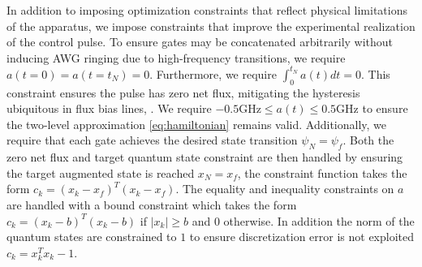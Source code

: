 In addition to imposing optimization constraints that
reflect physical limitations of the apparatus, we impose
constraints that improve the experimental realization of the control pulse.
To ensure gates may be concatenated arbitrarily without
inducing AWG ringing due to high-frequency transitions,
we require $a(t = 0) = a(t = t_{N}) = 0$.
Furthermore, we require $\int_{0}^{t_{N}} a(t) dt = 0$. This
constraint ensures the pulse has zero net flux, mitigating
the hysteresis ubiquitous in flux bias lines,
\cite{battistel2019fast, krantz2019quantum, zhang2020universal}.
We require $-0.5 \textrm{GHz} \le a(t) \le 0.5 \textrm{GHz}$
to ensure the two-level approximation \eqref{eq:hamiltonian}
remains valid. Additionally, we require that each gate achieves
the desired state transition $\psi_{N} = \psi_{f}$.
Both the zero net flux and target quantum state constraint
are then handled by ensuring the target augmented state is
reached $x_{N} = x_{f}$, the constraint function
takes the form
$c_{k} = (x_{k} - x_{f})^{T}(x_{k} - x_{f})$.
The equality and inequality constraints on $a$ are handled
with a bound constraint which takes the form
$c_{k} = (x_{k} - b)^{T}(x_{k} - b)$ if $\lvert x_{k} \rvert \ge b$
and $0$ otherwise.
In addition the norm of the quantum states
are constrained to $1$ to ensure discretization error is not
exploited $c_{k} = x_{k}^{T}x_{k} - 1$.


